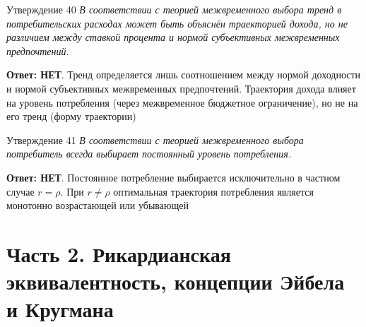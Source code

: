 \documentclass[10pt,a4paper]{article}
\newcommand{\qnet}{\textbf{\color{nored}Ответ: НЕТ}}
\newenvironment{answer}[2]{%
  \begin{qbox}{Утверждение #1}
  \textit{#2}\par\smallskip
}{%
  \end{qbox}\vspace{2pt}
}
\begin{document}
\begin{answer}{40}{В соответствии с теорией межвременного выбора тренд в потребительских расходах может быть объяснён траекторией дохода, но не различием между ставкой процента и нормой субъективных межвременных предпочтений.}
\qnet. Тренд определяется лишь соотношением между нормой доходности и нормой субъективных межвременных предпочтений. Траектория дохода влияет на уровень потребления (через межвременное бюджетное ограничение), но не на его тренд (форму траектории)
\end{answer}

\begin{answer}{41}{В соответствии с теорией межвременного выбора потребитель всегда выбирает постоянный уровень потребления.}
\qnet. Постоянное потребление выбирается исключительно в частном случае $r = \rho$. При $r \neq \rho$ оптимальная траектория потребления является монотонно возрастающей или убывающей
\end{answer}

\newpage
\section{Часть 2. Рикардианская эквивалентность, концепции Эйбела и Кругмана}
\end{document}
